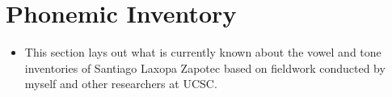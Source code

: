 \documentclass[12pt, letterpaper]{article}
\begin{document}




\section{Phonemic Inventory} \label{sec:Inventory}
\begin{itemize}
	\item This section lays out what is currently known about the vowel and tone inventories of Santiago Laxopa Zapotec based on fieldwork conducted by myself and other researchers at UCSC. 
\end{itemize}
\end{document}
